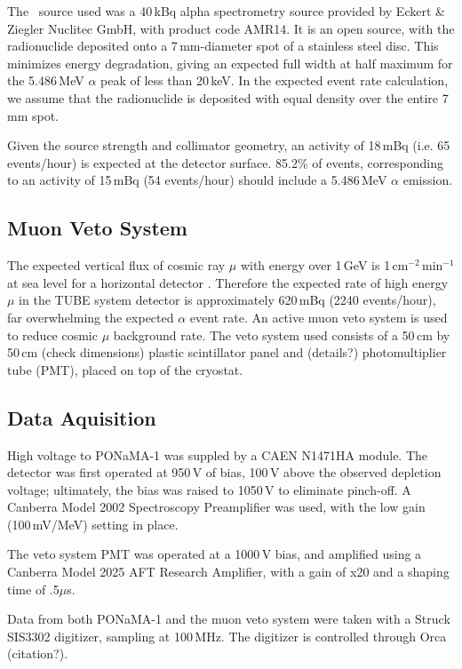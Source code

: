 \documentclass[groupedaddress,rmp,amsmath,amssymb,bibnotes,altaffilletter,twocolumn]{revtex4-1}
\begin{document}
The \am\ source used was a 40\,kBq alpha spectrometry source provided by Eckert \& Ziegler Nuclitec GmbH, with product code AMR14. It is an open source, with the radionuclide deposited onto a 7\,mm-diameter spot of a stainless steel disc. This minimizes energy degradation, giving an expected full width at half maximum for the 5.486\,MeV $\alpha$ peak of less than 20\,keV. In the expected event rate calculation, we assume that the radionuclide is deposited with equal density over the entire 7\,mm spot.

Given the source strength and collimator geometry, an activity of 18\,mBq (i.e. 65 events/hour) is expected at the detector surface. 85.2\% of events, corresponding to an activity of 15\,mBq (54 events/hour) should include a 5.486\,MeV $\alpha$ emission. 

\subsection{Muon Veto System}
The expected vertical flux of cosmic ray $\mu$ with energy over 1\,GeV is 1\,cm$^{-2}$\,min$^{-1}$ at sea level for a horizontal detector \cite{PDG2016}. Therefore the expected rate of high energy $\mu$ in the TUBE system detector is approximately 620\,mBq (2240 events/hour), far overwhelming the expected $\alpha$ event rate. An active muon veto system is used to reduce cosmic $\mu$ background rate. The veto system used consists of a 50\,cm by 50\,cm (check dimensions) plastic scintillator panel and (details?) photomultiplier tube (PMT), placed on top of the cryostat. 

\subsection{Data Aquisition}
High voltage to PONaMA-1 was suppled by a CAEN N1471HA module. The detector was first operated at 950\,V of bias, 100\,V above the observed depletion voltage; ultimately, the bias was raised to 1050\,V to eliminate pinch-off. A Canberra Model 2002 Spectroscopy Preamplifier was used, with the low gain (100\,mV/MeV) setting in place. 

The veto system PMT was operated at a 1000\,V bias, and amplified using a Canberra Model 2025 AFT Research Amplifier, with a gain of x20 and a shaping time of .5$\mu$s. 

Data from both PONaMA-1 and the muon veto system were taken with a Struck SIS3302 digitizer, sampling at 100\,MHz. The digitizer is controlled through Orca (citation?).
\end{document}
